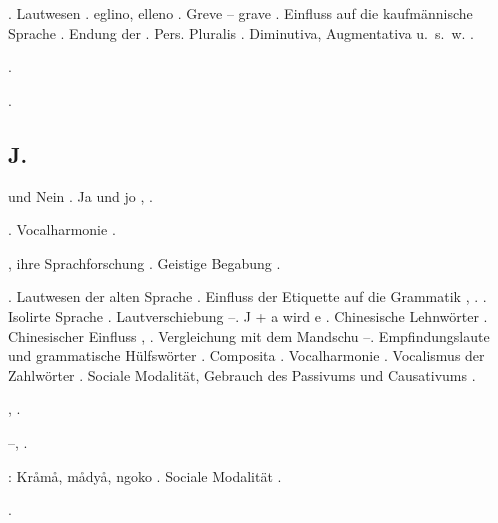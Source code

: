 \begin{register}
. Lautwesen \pageref{sp.34}.  eglino, elleno \pageref{sp.214}. Greve – grave \pageref{sp.222}. Einfluss auf die kaufmännische Sprache \pageref{sp.265}\sed{, \pageref{sp.289}}. Endung der \pageref{sp.3}. Pers. Pluralis \pageref{sp.435}. Diminutiva, Augmentativa u.~s.~w. \pageref{sp.445}.

 \pageref{sp.147}.

 \pageref{sp.445}.


\subsection*{J.}\label{reg.J}

 und Nein \pageref{sp.103}. Ja und jo \pageref{sp.233}, \pageref{sp.285}.

 \pageref{sp.271}.  Vocalharmonie \pageref{sp.402}.

, ihre Sprachforschung \pageref{sp.24}. Geistige Begabung \pageref{sp.389}.

. Lautwesen der alten Sprache \pageref{sp.34}. Einfluss der Etiquette auf die Grammatik \pageref{sp.95}, \pageref{sp.246}.  \pageref{sp.129}. Isolirte Sprache \pageref{sp.147}. Lautverschiebung \pageref{sp.190}–\pageref{sp.191}. J + a wird e \pageref{sp.199}.  Chinesische Lehnwörter \pageref{sp.266}. Chinesischer Einfluss \pageref{sp.271}, \pageref{sp.428}. Vergleichung mit dem Mandschu \pageref{sp.289}–\pageref{sp.290}. Empfindungslaute und grammatische Hülfswörter \pageref{sp.347}. Composita   \pageref{sp.379}. Vocalharmonie \pageref{sp.402}. Vocalismus der Zahlwörter \pageref{sp.408}. Sociale Modalität, Gebrauch des Passivums und Causativums \pageref{sp.474}.

 \pageref{sp.162}, \pageref{sp.282}.

 \pageref{sp.126}–\pageref{sp.126}, \pageref{sp.289}.

: Kråmå, mådyå, ngoko \pageref{sp.246}. Sociale Modalität \pageref{sp.475}.

 \pageref{sp.322}.


\end{register}
